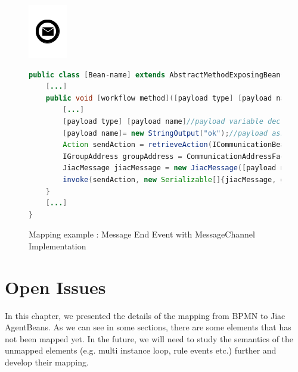 \begin{figure}[hbtp]
\begin{minipage}[c]{0.28\textwidth}
\includegraphics{images/mapping/message_end.png}
\end{minipage}
\begin{minipage}[c]{0.72\textwidth}
\begin{lstlisting}[language = Java]
public class [Bean-name] extends AbstractMethodExposingBean{
	[...]
	public void [workflow method]([payload type] [payload name]){
		[...]
		[payload type] [payload name]//payload variable declaration
		[payload name]= new StringOutput("ok");//payload assignment
		Action sendAction = retrieveAction(ICommunicationBean.ACTION_SEND);
		IGroupAddress groupAddress = CommunicationAddressFactory.createGroupAddress([channel]);
		JiacMessage jiacMessage = new JiacMessage([payload name]);
		invoke(sendAction, new Serializable[]{jiacMessage, groupAddress});
	}
	[...]
}
\end{lstlisting}
\end{minipage}
\caption{Mapping example : Message End Event with MessageChannel Implementation}%
\label{fig:channel_end}
\end{figure}
\newpage
\section{Open Issues}

In this chapter, we presented the details of the mapping from BPMN to Jiac AgentBeans. As we can see in some sections, there are some elements that has not been mapped yet. In the future, we will need to study the semantics of the unmapped elements (e.g. multi instance loop, rule events etc.) further and develop their mapping.